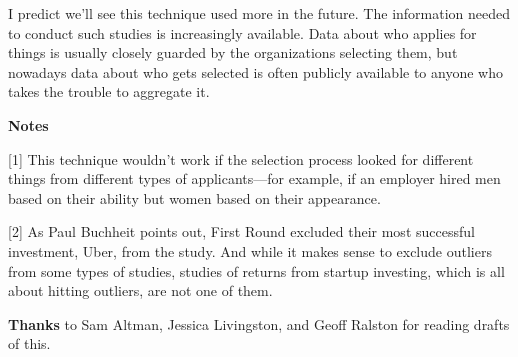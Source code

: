 I predict we'll see this technique used more in the future. The
information needed to conduct such studies is increasingly available.
Data about who applies for things is usually closely guarded by the
organizations selecting them, but nowadays data about who gets selected
is often publicly available to anyone who takes the trouble to aggregate
it.

\textbf{Notes}

{[}1{]} This technique wouldn't work if the selection process looked for
different things from different types of applicants---for example, if an
employer hired men based on their ability but women based on their
appearance.

{[}2{]} As Paul Buchheit points out, First Round excluded their most
successful investment, Uber, from the study. And while it makes sense to
exclude outliers from some types of studies, studies of returns from
startup investing, which is all about hitting outliers, are not one of
them.

\textbf{Thanks} to Sam Altman, Jessica Livingston, and Geoff Ralston for
reading drafts of this.
